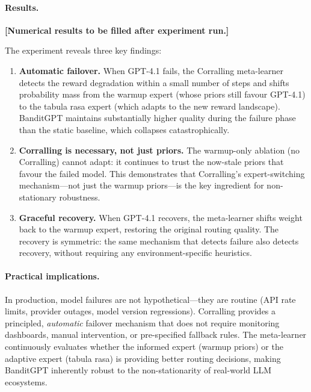 

\paragraph{Results.}
\textbf{[Numerical results to be filled after experiment run.]}

The experiment reveals three key findings:

\begin{enumerate}[leftmargin=*]
    \item \textbf{Automatic failover.}
    When GPT-4.1 fails, the Corralling meta-learner detects the reward
    degradation within a small number of steps and shifts probability
    mass from the warmup expert (whose priors still favour GPT-4.1) to
    the tabula rasa expert (which adapts to the new reward landscape).
    BanditGPT maintains substantially higher quality during the failure
    phase than the static baseline, which collapses catastrophically.

    \item \textbf{Corralling is necessary, not just priors.}
    The warmup-only ablation (no Corralling) cannot adapt: it continues
    to trust the now-stale priors that favour the failed model.
    This demonstrates that Corralling's expert-switching mechanism---not
    just the warmup priors---is the key ingredient for non-stationary
    robustness.

    \item \textbf{Graceful recovery.}
    When GPT-4.1 recovers, the meta-learner shifts weight back to the
    warmup expert, restoring the original routing quality.  The recovery
    is symmetric: the same mechanism that detects failure also detects
    recovery, without requiring any environment-specific heuristics.
\end{enumerate}

\paragraph{Practical implications.}
In production, model failures are not hypothetical---they are routine
(API rate limits, provider outages, model version regressions).
Corralling provides a principled, \emph{automatic} failover mechanism
that does not require monitoring dashboards, manual intervention, or
pre-specified fallback rules.  The meta-learner continuously evaluates
whether the informed expert (warmup priors) or the adaptive expert
(tabula rasa) is providing better routing decisions, making BanditGPT
inherently robust to the non-stationarity of real-world LLM
ecosystems.
